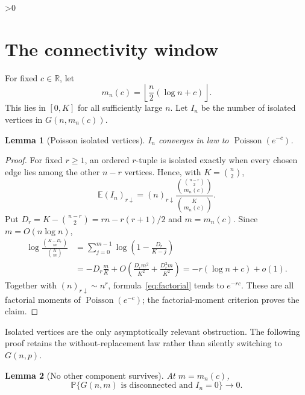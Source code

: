 \documentclass[10pt]{article}
\providecommand{\CRevisionRound}{2}
\newtheorem{lemma}{Lemma}
\newcommand{\E}{\mathbb E}
\newcommand{\Pp}{\mathbb P}
\newcommand{\fall}[2]{(#1)_{#2\downarrow}}
\begin{document}
\ifnum\CRevisionRound>0
\section{The connectivity window}
For fixed $c\in\mathbb R$, let
\begin{equation}\label{eq:window}
 m_n(c)=\left\lfloor\frac n2(\log n+c)\right\rfloor .
\end{equation}
This lies in $[0,K]$ for all sufficiently large $n$.  Let $I_n$ be the number
of isolated vertices in $G(n,m_n(c))$.

\begin{lemma}[Poisson isolated vertices]\label{lem:poisson}
$I_n$ converges in law to $\operatorname{Poisson}(e^{-c})$.
\end{lemma}

\begin{proof}
For fixed $r\geq1$, an ordered $r$-tuple is isolated exactly when every
chosen edge lies among the other $n-r$ vertices.  Hence, with $K=\binom n2$,
\begin{equation}\label{eq:factorial}
 \E\fall{I_n}{r}=\fall{n}{r}
 \frac{\binom{\binom{n-r}{2}}{m_n(c)}}{\binom K{m_n(c)}}.
\end{equation}
Put $D_r=K-\binom{n-r}{2}=rn-r(r+1)/2$ and $m=m_n(c)$.  Since
$m=O(n\log n)$,
\begin{align*}
 \log\frac{\binom{K-D_r}{m}}{\binom Km}
 &=\sum_{j=0}^{m-1}\log\left(1-\frac{D_r}{K-j}\right)\\
 &=-D_r\frac mK+O\left(\frac{D_rm^2}{K^2}
                     +\frac{D_r^2m}{K^2}\right)
 =-r(\log n+c)+o(1).
\end{align*}
Together with $\fall{n}{r}\sim n^r$, formula~\eqref{eq:factorial} tends
to $e^{-rc}$.  These are all factorial moments of
$\operatorname{Poisson}(e^{-c})$; the factorial-moment criterion proves the
claim.
\end{proof}

Isolated vertices are the only asymptotically relevant obstruction.  The
following proof retains the without-replacement law rather than silently
switching to $G(n,p)$.

\begin{lemma}[No other component survives]\label{lem:other}
At $m=m_n(c)$,
\[
 \Pp\{G(n,m)\text{ is disconnected and }I_n=0\}\longrightarrow0.
\]
\end{lemma}
\end{document}
